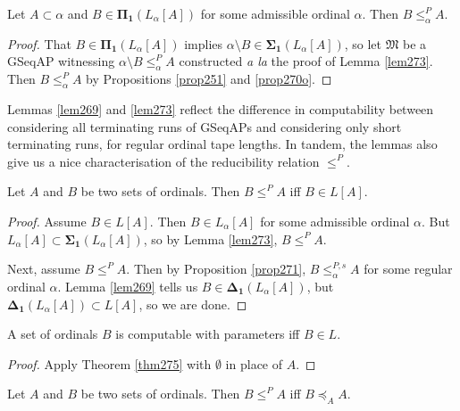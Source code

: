 \documentclass[12pt]{article}
\numberwithin{equation}{section}
\begin{document}
\begin{cor}
Let $A \subset \alpha$ and $B \in \mathbf{\Pi_1}(L_{\alpha}[A])$ for some admissible ordinal $\alpha$. Then $B \leq^P_{\alpha} A$.
\end{cor}

\begin{proof}
That $B \in \mathbf{\Pi_1}(L_{\alpha}[A])$ implies $\alpha \setminus B \in \mathbf{\Sigma_1}(L_{\alpha}[A])$, so let $\mathfrak{M}$ be a GSeqAP witnessing $\alpha \setminus B \leq^P_{\alpha} A$ constructed \textit{a la} the proof of Lemma \ref{lem273}. Then $B \leq^P_{\alpha} A$ by Propositions \ref{prop251} and \ref{prop270o}.
\end{proof}

Lemmas \ref{lem269} and \ref{lem273} reflect the difference in computability between considering all terminating runs of GSeqAPs and considering only short terminating runs, for regular ordinal tape lengths. In tandem, the lemmas also give us a nice characterisation of the reducibility relation $\leq^P$.

\begin{thm}\label{thm275}
Let $A$ and $B$ be two sets of ordinals. Then $B \leq^P A$ iff $B \in L[A]$.
\end{thm}

\begin{proof}
Assume $B \in L[A]$. Then $B \in L_{\alpha}[A]$ for some admissible ordinal $\alpha$. But $L_{\alpha}[A] \subset \mathbf{\Sigma_1}(L_{\alpha}[A])$, so by Lemma \ref{lem273}, $B \leq^P A$. 

Next, assume $B \leq^P A$. Then by Proposition \ref{prop271}, $B \leq^{P, s}_{\alpha} A$ for some regular ordinal $\alpha$. Lemma \ref{lem269} tells us $B \in \mathbf{\Delta_1}(L_{\alpha}[A])$, but $\mathbf{\Delta_1}(L_{\alpha}[A]) \subset L[A]$, so we are done.
\end{proof}

\begin{cor}
A set of ordinals $B$ is computable with parameters iff $B \in L$.
\end{cor}

\begin{proof}
Apply Theorem \ref{thm275} with $\emptyset$ in place of $A$. 
\end{proof}

\begin{cor}\label{cor8343}
Let $A$ and $B$ be two sets of ordinals. Then $B \leq^P A$ iff $B \preceq_A A$.
\end{cor}
\end{document}
